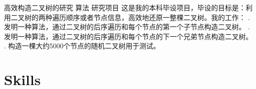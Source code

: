 \documentclass[11pt,a4paper]{moderncv}
\begin{document}
{高效构造二叉树的研究}
{算法}
{研究项目}{}
{
这是我的本科毕设项目，毕设的目标是：利用二叉树的两种遍历顺序或者节点信息，高效地还原一整棵二叉树。我的工作：
. 发明一种算法，通过二叉树的后序遍历和每个节点的第一个子节点构造二叉树。
. 发明一种算法，通过二叉树的后序遍历和每个节点的下一个兄弟节点构造二叉树。
. 构造一棵大约5000个节点的随机二叉树用于测试。
\newline
}


\section{Skills}
\closesection{}                   %
\renewcommand{\listitemsymbol}{-} %
\end{document}
